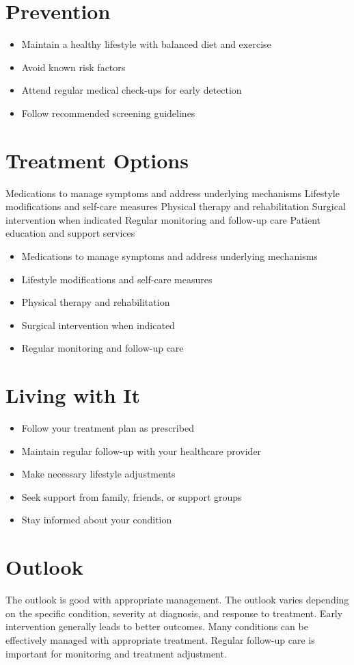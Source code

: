 \section{Prevention}
\begin{itemize}[noitemsep]
  \item Maintain a healthy lifestyle with balanced diet and exercise
  \item Avoid known risk factors
  \item Attend regular medical check-ups for early detection
  \item Follow recommended screening guidelines
\end{itemize}
\section{Treatment Options}
Medications to manage symptoms and address underlying mechanisms Lifestyle modifications and self-care measures Physical therapy and rehabilitation Surgical intervention when indicated Regular monitoring and follow-up care Patient education and support services

\begin{itemize}[noitemsep]
  \item Medications to manage symptoms and address underlying mechanisms
  \item Lifestyle modifications and self-care measures
  \item Physical therapy and rehabilitation
  \item Surgical intervention when indicated
  \item Regular monitoring and follow-up care
\end{itemize}
\section{Living with It}
\begin{itemize}[noitemsep]
  \item Follow your treatment plan as prescribed
  \item Maintain regular follow-up with your healthcare provider
  \item Make necessary lifestyle adjustments
  \item Seek support from family, friends, or support groups
  \item Stay informed about your condition
\end{itemize}
\section{Outlook}
The outlook is good with appropriate management. The outlook varies depending on the specific condition, severity at diagnosis, and response to treatment. Early intervention generally leads to better outcomes. Many conditions can be effectively managed with appropriate treatment. Regular follow-up care is important for monitoring and treatment adjustment.
